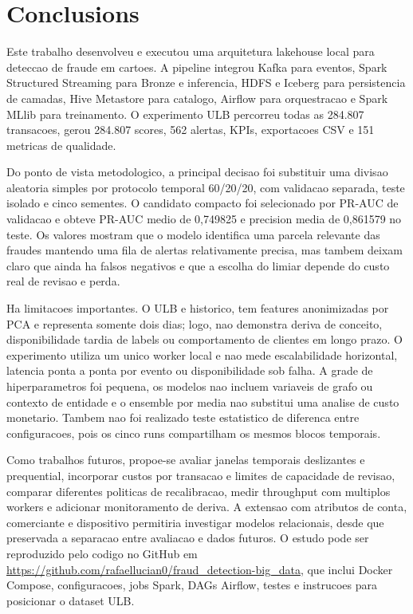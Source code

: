 \documentclass[10pt,twocolumn]{article}
\begin{document}
\section{Conclusions}

Este trabalho desenvolveu e executou uma arquitetura lakehouse local para deteccao de fraude em cartoes. A pipeline integrou Kafka para eventos, Spark Structured Streaming para Bronze e inferencia, HDFS e Iceberg para persistencia de camadas, Hive Metastore para catalogo, Airflow para orquestracao e Spark MLlib para treinamento. O experimento ULB percorreu todas as 284.807 transacoes, gerou 284.807 scores, 562 alertas, KPIs, exportacoes CSV e 151 metricas de qualidade.

Do ponto de vista metodologico, a principal decisao foi substituir uma divisao aleatoria simples por protocolo temporal 60/20/20, com validacao separada, teste isolado e cinco sementes. O candidato compacto foi selecionado por PR-AUC de validacao e obteve PR-AUC medio de 0,749825 e precision media de 0,861579 no teste. Os valores mostram que o modelo identifica uma parcela relevante das fraudes mantendo uma fila de alertas relativamente precisa, mas tambem deixam claro que ainda ha falsos negativos e que a escolha do limiar depende do custo real de revisao e perda.

Ha limitacoes importantes. O ULB e historico, tem features anonimizadas por PCA e representa somente dois dias; logo, nao demonstra deriva de conceito, disponibilidade tardia de labels ou comportamento de clientes em longo prazo. O experimento utiliza um unico worker local e nao mede escalabilidade horizontal, latencia ponta a ponta por evento ou disponibilidade sob falha. A grade de hiperparametros foi pequena, os modelos nao incluem variaveis de grafo ou contexto de entidade e o ensemble por media nao substitui uma analise de custo monetario. Tambem nao foi realizado teste estatistico de diferenca entre configuracoes, pois os cinco runs compartilham os mesmos blocos temporais.

Como trabalhos futuros, propoe-se avaliar janelas temporais deslizantes e prequential, incorporar custos por transacao e limites de capacidade de revisao, comparar diferentes politicas de recalibracao, medir throughput com multiplos workers e adicionar monitoramento de deriva. A extensao com atributos de conta, comerciante e dispositivo permitiria investigar modelos relacionais, desde que preservada a separacao entre avaliacao e dados futuros. O estudo pode ser reproduzido pelo codigo no GitHub em \url{https://github.com/rafaellucian0/fraud_detection-big_data}, que inclui Docker Compose, configuracoes, jobs Spark, DAGs Airflow, testes e instrucoes para posicionar o dataset ULB.
\end{document}
